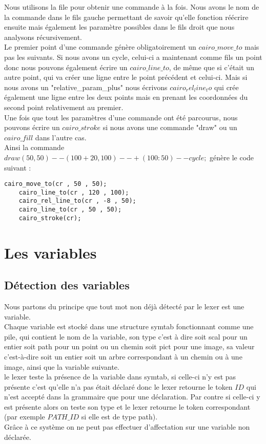 \documentclass[a4paper,titlepage]{article}
\begin{document}
Nous utilisons la file pour obtenir une commande à la fois. Nous avons le nom de la commande dans le fils gauche permettant de savoir qu'elle fonction réécrire ensuite mais également les paramètre possibles dans le fils droit que nous analysons récursivement.\\
Le premier point d'une commande génère obligatoirement un $cairo\_move\_to$ mais pas les suivants.
Si nous avons un cycle, celui-ci a maintenant comme fils un point donc nous pouvons également écrire un $cairo\_line\_to$, de même que si c'était un autre point, qui va créer une ligne entre le point précédent et celui-ci. Mais si nous avons un "relative\_param\_plus" nous écrivons $cairo_rel_line_to$ qui crée également une ligne entre les deux points mais en prenant les coordonnées du second point relativement au premier.\\
Une fois que tout les paramètres d'une commande ont été parcourus, nous pouvons écrire un $cairo\_stroke$ si nous avons une commande "draw" ou un $cairo\_fill$ dans l'autre cas. \\

Ainsi la commande $draw(50,50)--(100 + 20,100)--+(100 : 50)--cycle;$ génère le code suivant :

\lstset{language=C}
\begin{lstlisting}[frame=single]	   
    cairo_move_to(cr , 50 , 50);
    cairo_line_to(cr , 120 , 100);
    cairo_rel_line_to(cr , -8 , 50);
    cairo_line_to(cr , 50 , 50);
    cairo_stroke(cr);
\end{lstlisting}	

\newpage
\section{Les variables}

\subsection{Détection des variables}

Nous partons du principe que tout mot non déjà détecté par le lexer est une variable.\\

Chaque variable est stocké dans une structure symtab fonctionnant comme une pile, qui contient le nom de la variable, son type c'est à dire soit scal pour un entier soit path pour un point ou un chemin soit pict pour une image, sa valeur c'est-à-dire soit un entier soit un arbre correspondant à un chemin ou à une image, ainsi que la variable suivante.\\
le lexer teste la présence de la variable dans symtab, si celle-ci n'y est pas présente c'est qu'elle n'a pas était déclaré donc le lexer retourne le token $ID$ qui n'est accepté dans la grammaire que pour une déclaration. Par contre si celle-ci y est présente alors on teste son type et le lexer retourne le token correspondant (par exemple $PATH\_ID$ si elle est de type path).\\
Grâce à ce système on ne peut pas effectuer d'affectation sur une variable non déclarée.\\
\end{document}
